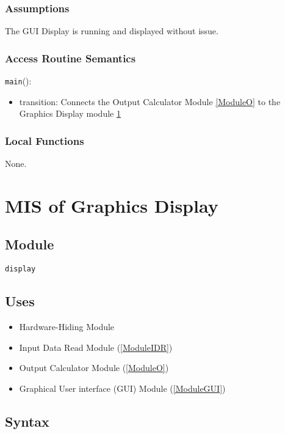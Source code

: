 \documentclass[12pt, titlepage]{article}
\def\code#1{\texttt{#1}}
\begin{document}
\subsubsection{Assumptions}

The GUI Display is running and displayed without issue.

\subsubsection{Access Routine Semantics}

\noindent \code{main}():
\begin{itemize}
  \item transition: Connects the Output Calculator Module \ref{ModuleO} to the Graphics Display module \ref{ModuleGD}
\end{itemize}

\subsubsection{Local Functions}

None.

\section{MIS of Graphics Display} \label{ModuleGD} 

\subsection{Module}

\code{display}

\subsection{Uses}

\begin{itemize}
  \item Hardware-Hiding Module  
  \item Input Data Read Module (\ref{ModuleIDR})
  \item Output Calculator Module (\ref{ModuleO})
  \item Graphical User interface (GUI) Module (\ref{ModuleGUI})
\end{itemize}

\subsection{Syntax}
\end{document}

